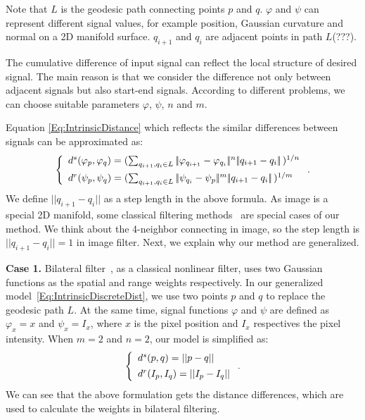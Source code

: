 Note that $L$ is the geodesic path connecting points $p$ and $q$.
$\varphi$ and $\psi$ can represent different signal values, for example position, Gaussian curvature and normal on a 2D manifold surface.
$q_{i+1}$ and $q_i$ are adjacent points in path $L$(???).

The cumulative difference of input signal can reflect the local structure of desired signal.
The main reason is that we consider the difference not only between adjacent signals but also start-end signals.
According to different problems, we can choose suitable parameters $\varphi$, $\psi$, $n$ and $m$.

Equation \ref{Eq:IntrinsicDistance} which reflects the similar differences between signals can be approximated as:
 \begin{equation}
 \label{Eq:IntrinsicDiscreteDist}
 \left \{
 \begin{array}{ll}
        d^{s}(\varphi_p, \varphi_q) = (\sum_{q_{i+1}, q_i \in{L}}|\!|\varphi_{q_{i+1}} - \varphi_{q_i}|\!|^{n}|\!|q_{i+1} - q_{i}|\!|\,)^{1/n} \vspace{1.5mm}\\
        d^{r}(\psi_p, \psi_q) = (\sum_{q_{i+1}, q_i \in{L}}|\!|\psi_{q_i} - \psi_{p}|\!|^{m}|\!|q_{i+1} - q_{i}|\!|\,)^{1/m}
 \end{array}
 \right. .
 \end{equation}
We define $|\!|q_{i+1} - q_{i}|\!|$ as a step length in the above formula.
As image is a special 2D manifold, some classical filtering methods~\cite{tomasi1998bilateral, grazzini2009edge, Chang2015propagated} are special cases of our method.
We think about the 4-neighbor connecting in image, so the step length is $||q_{i+1} - q_{i}|| = 1$ in image filter. %
Next, we explain why our method are generalized.

{\bfseries Case 1.}
Bilateral filter~\cite{tomasi1998bilateral}, as a classical nonlinear filter, uses two Gaussian functions as the spatial and range weights respectively.
In our generalized model~\ref{Eq:IntrinsicDiscreteDist}, we use two points $p$ and $q$ to replace the geodesic path $L$.
At the same time, signal functions $\varphi$ and $\psi$ are defined as $\varphi_{x} = x$ and $\psi_{x} = I_x$,
where $x$ is the pixel position and $I_x$ respectives the pixel intensity.
When $m=2$ and $n=2$, our model is simplified as:
\begin{equation}
\label{Eq:BilateralDistance}
\left \{
\begin{array}{ll}
        d^{s}(p, q) = ||p - q|| \vspace{1.5mm}\\
        d^{r}(I_{p}, I_{q}) = || I_{p} - I_{q} || \\
\end{array}
\right. .
\end{equation}
We can see that the above formulation gets the distance differences, which are used to calculate the weights in bilateral filtering.

